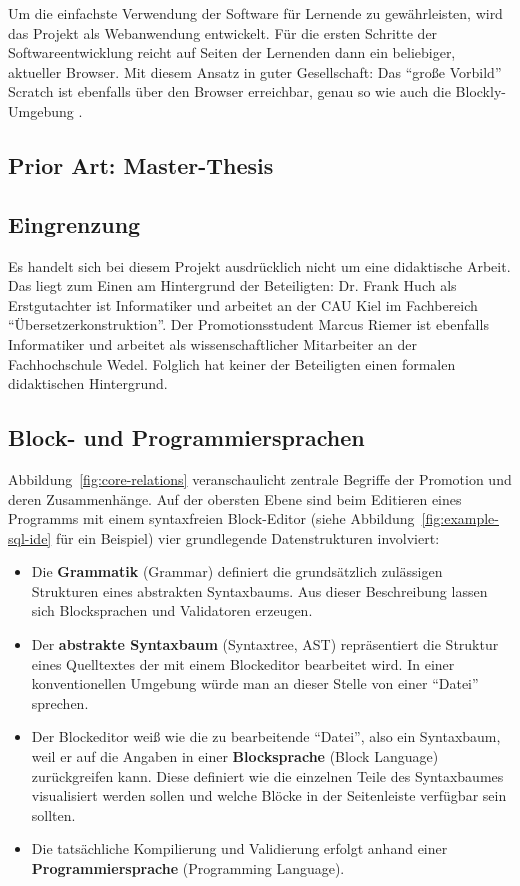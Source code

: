 \documentclass[paper=a4,fontsize=12pt,parskip=half]{scrartcl}
\begin{document}
Um die einfachste Verwendung der Software für Lernende zu gewährleisten, wird das Projekt als Webanwendung entwickelt. Für die ersten Schritte der Softwareentwicklung reicht auf Seiten der Lernenden dann ein beliebiger, aktueller Browser. Mit diesem Ansatz in guter Gesellschaft: Das \enquote{große Vorbild} Scratch ist ebenfalls über den Browser erreichbar, genau so wie auch die Blockly-Umgebung \cite[vgl. S. 28]{riemer_blattwerkzeug_2016}.

\subsection{Prior Art: Master-Thesis}

\subsection{Eingrenzung}

Es handelt sich bei diesem Projekt ausdrücklich nicht um eine didaktische Arbeit. Das liegt zum Einen am Hintergrund der Beteiligten: Dr. Frank Huch als Erstgutachter ist Informatiker und arbeitet an der CAU Kiel im Fachbereich \enquote{Übersetzerkonstruktion}. Der Promotionsstudent Marcus Riemer ist ebenfalls Informatiker und arbeitet als wissenschaftlicher Mitarbeiter an der Fachhochschule Wedel. Folglich hat keiner der Beteiligten einen formalen didaktischen Hintergrund.

\subsection{Block- und Programmiersprachen}

Abbildung~\ref{fig:core-relations} veranschaulicht zentrale Begriffe der Promotion und deren Zusammenhänge. Auf der obersten Ebene sind beim Editieren eines Programms mit einem syntaxfreien Block-Editor (siehe Abbildung~\ref{fig:example-sql-ide} für ein Beispiel) vier grundlegende Datenstrukturen involviert:

\begin{itemize}
\item Die \textbf{Grammatik} (Grammar) definiert die grundsätzlich zulässigen Strukturen eines abstrakten Syntaxbaums. Aus dieser Beschreibung lassen sich Blocksprachen und Validatoren erzeugen.
\item Der \textbf{abstrakte Syntaxbaum} (Syntaxtree, AST) repräsentiert die Struktur eines Quelltextes der mit einem Blockeditor bearbeitet wird. In einer konventionellen Umgebung würde man an dieser Stelle von einer \enquote{Datei} sprechen.
\item Der Blockeditor weiß wie die zu bearbeitende \enquote{Datei}, also ein Syntaxbaum, weil er auf die Angaben in einer \textbf{Blocksprache} (Block Language) zurückgreifen kann. Diese definiert wie die einzelnen Teile des Syntaxbaumes visualisiert werden sollen und welche Blöcke in der Seitenleiste verfügbar sein sollten.
\item Die tatsächliche Kompilierung und Validierung erfolgt anhand einer \textbf{Programmiersprache} (Programming Language).
\end{itemize}
\end{document}
